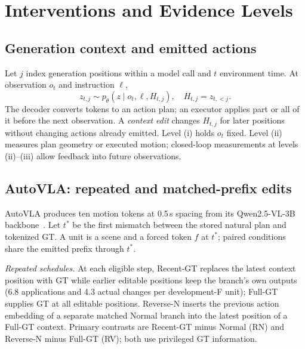 \section{Interventions and Evidence Levels}
\label{sec:design}
\subsection{Generation context and emitted actions}
Let $j$ index generation positions within a model call and $t$ environment time. At observation $o_t$ and instruction $\ell$,
\begin{equation}
 z_{t,j}\sim p_\theta(z\mid o_t,\ell,H_{t,j}),\quad H_{t,j}=z_{t,<j}.
\end{equation}
The decoder converts tokens to an action plan; an executor applies part or all of it before the next observation. A \emph{context edit} changes $H_{t,j}$ for later positions without changing actions already emitted. Level (i) holds $o_t$ fixed. Level (ii) measures plan geometry or executed motion; closed-loop measurements at levels (ii)--(iii) allow feedback into future observations.

\subsection{AutoVLA: repeated and matched-prefix edits}
AutoVLA produces ten motion tokens at 0.5\,s spacing from its Qwen2.5-VL-3B backbone~\cite{bai2025qwen25vl}. Let $t^*$ be the first mismatch between the stored natural plan and tokenized GT. A unit is a scene and a forced token $f$ at $t^*$; paired conditions share the emitted prefix through $t^*$.

\emph{Repeated schedules.} At each eligible step, Recent-GT replaces the latest context position with GT while earlier editable positions keep the branch's own outputs (6.8 applications and 4.3 actual changes per development-F unit); Full-GT supplies GT at all editable positions. Reverse-N inserts the previous action embedding of a separate matched Normal branch into the latest position of a Full-GT context. Primary contrasts are Recent-GT minus Normal (RN) and Reverse-N minus Full-GT (RV); both use privileged GT information.

